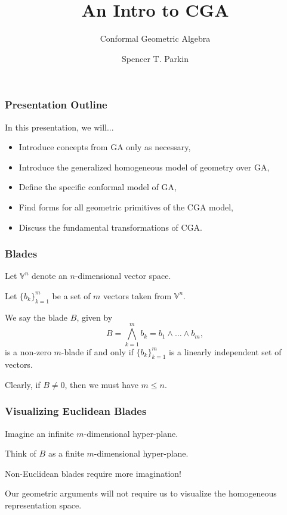 \documentclass{beamer}
\title{An Intro to CGA}
\subtitle{Conformal Geometric Algebra}
\author{Spencer T. Parkin}
\institute{Avalanche Software}
\newcommand{\V}{\mathbb{V}}
\begin{document}
\frame{\titlepage}

\begin{frame}
\frametitle{Presentation Outline}
In this presentation, we will...
\begin{itemize}
\item Introduce concepts from GA only as necessary,
\item Introduce the generalized homogeneous model of geometry over GA,
\item Define the specific conformal model of GA,
\item Find forms for all geometric primitives of the CGA model,
\item Discuss the fundamental transformations of CGA.
\end{itemize}
\end{frame}

\begin{frame}
\frametitle{Blades}
Let $\V^n$ denote an $n$-dimensional vector space.

Let $\{b_k\}_{k=1}^m$ be a set of $m$ vectors taken from $\V^n$.
\begin{definition}
We say the blade $B$, given by
\begin{equation*}
B = \bigwedge_{k=1}^m b_k = b_1\wedge\dots\wedge b_m,
\end{equation*}
is a non-zero $m$-blade if and only if $\{b_k\}_{k=1}^m$
is a linearly independent set of vectors.
\end{definition}
Clearly, if $B\neq 0$, then we must have $m\leq n$.
\end{frame}

\begin{frame}
\frametitle{Visualizing Euclidean Blades}
Imagine an \alert{infinite} $m$-dimensional hyper-plane.

Think of $B$ as a \alert{finite} $m$-dimensional hyper-plane.

\alert{Non-Euclidean} blades require more imagination!

Our geometric arguments will not require us to visualize the homogeneous representation space.
\end{frame}
\end{document}
